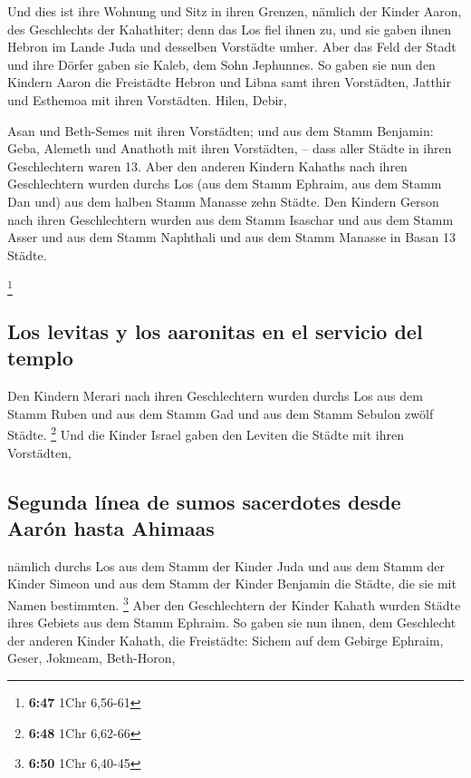  Und dies ist ihre Wohnung und Sitz in ihren Grenzen,
nämlich der Kinder Aaron, des Geschlechts der Kahathiter; denn das Los
fiel ihnen zu,  und sie gaben ihnen Hebron im Lande Juda
und desselben Vorstädte umher.  Aber das Feld der Stadt
und ihre Dörfer gaben sie Kaleb, dem Sohn Jephunnes.  So
gaben sie nun den Kindern Aaron die Freistädte Hebron und Libna samt
ihren Vorstädten, Jatthir und Esthemoa mit ihren Vorstädten.
 Hilen, Debir,

 Asan und Beth-Semes mit ihren Vorstädten;
 und aus dem Stamm Benjamin: Geba, Alemeth und Anathoth
mit ihren Vorstädten, -- dass aller Städte in ihren Geschlechtern waren
13.  Aber den anderen Kindern Kahaths nach ihren
Geschlechtern wurden durchs Los (aus dem Stamm Ephraim, aus dem Stamm
Dan und) aus dem halben Stamm Manasse zehn Städte.  Den
Kindern Gerson nach ihren Geschlechtern wurden aus dem Stamm Isaschar
und aus dem Stamm Asser und aus dem Stamm Naphthali und aus dem Stamm
Manasse in Basan 13 Städte.

\footnote{\textbf{6:47} 1Chr 6,56-61}

\hypertarget{los-levitas-y-los-aaronitas-en-el-servicio-del-templo}{%
\subsection{Los levitas y los aaronitas en el servicio del
templo}\label{los-levitas-y-los-aaronitas-en-el-servicio-del-templo}}

 Den Kindern Merari nach ihren Geschlechtern wurden
durchs Los aus dem Stamm Ruben und aus dem Stamm Gad und aus dem Stamm
Sebulon zwölf Städte. \footnote{\textbf{6:48} 1Chr 6,62-66}
 Und die Kinder Israel gaben den Leviten die Städte mit
ihren Vorstädten,

\hypertarget{segunda-luxednea-de-sumos-sacerdotes-desde-aaruxf3n-hasta-ahimaas}{%
\subsection{Segunda línea de sumos sacerdotes desde Aarón hasta
Ahimaas}\label{segunda-luxednea-de-sumos-sacerdotes-desde-aaruxf3n-hasta-ahimaas}}

 nämlich durchs Los aus dem Stamm der Kinder Juda und aus
dem Stamm der Kinder Simeon und aus dem Stamm der Kinder Benjamin die
Städte, die sie mit Namen bestimmten. \footnote{\textbf{6:50} 1Chr
  6,40-45}  Aber den Geschlechtern der Kinder Kahath
wurden Städte ihres Gebiets aus dem Stamm Ephraim.  So
gaben sie nun ihnen, dem Geschlecht der anderen Kinder Kahath, die
Freistädte: Sichem auf dem Gebirge Ephraim, Geser, 
Jokmeam, Beth-Horon,

